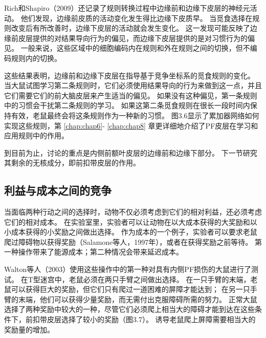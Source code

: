 Rich和Shapiro（2009）还记录了规则转换过程中边缘前和边缘下皮层的神经元活动。
他们发现，边缘前皮质的活动变化发生得比边缘下皮质早。
当觅食选择在规则改变后有所改善时，边缘下皮层的活动就会发生变化。
这一发现可能反映了边缘前皮层提供的对结果导向行为的偏见，而边缘下皮层提供的是对习惯行为的偏见。
一般来说，这些区域中的细胞编码内在规则和外在规则之间的切换，但不编码规则内的切换。\par


这些结果表明，边缘前和边缘下皮层在指导基于竞争坐标系的觅食规则的变化。
当大鼠试图学习第二条规则时，它们必须使用结果导向的行为来做到这一点，并且它们需要它们的前大脑皮层来产生适当的偏见。
如果没有这种偏见，第一条规则中的习惯会干扰第二条规则的学习。
如果这第二条觅食规则在很长一段时间内保持有效，老鼠最终会将这条规则作为一种新的习惯。
图3.6显示了累加器网络如何实现这些规则，第 \ref{chap:chap6}- \ref{chap:chap8} 章更详细地介绍了PF皮层在学习和应用规则中的作用。\par


到目前为止，讨论的重点是内侧前额叶皮层的边缘前和边缘下部分。
下一节研究其剩余的无核成分，即前扣带皮层的作用。\par



\subsection{利益与成本之间的竞争}

当面临两种行动之间的选择时，动物不仅必须考虑到它们的相对利益，还必须考虑它们的相对成本。
在实验室里，实验者可以让动物在以大成本获得的大奖励和以小成本获得的小奖励之间做出选择。
作为成本的一个例子，实验者可以要求老鼠爬过障碍物以获得奖励（Salamone等人，1997年），或者在获得奖励之前等待\cite{Cardinal et al,2001}。
第一种操作带来了能源成本；第二种情况会带来延迟成本。\par


Walton等人（2003）使用这些操作中的第一种对具有内侧PF损伤的大鼠进行了测试。
在T型迷宫中，老鼠必须在两只手臂之间做出选择。
在一只手臂的末端，老鼠可以获得巨大的奖励，但它们只有爬过一道困难的屏障才能达到；
在另一只手臂的末端，他们可以获得少量奖励，而无需付出克服障碍所需的努力。
正常大鼠选择了两种奖励中较大的一种，尽管它们必须爬上相当大的障碍才能到达在这些条件下，前扣带皮层选择了较小的奖励（图3.7）。
诱导老鼠爬上屏障需要相当大的奖励量的增加\cite{Walton et al 2002}。\par


